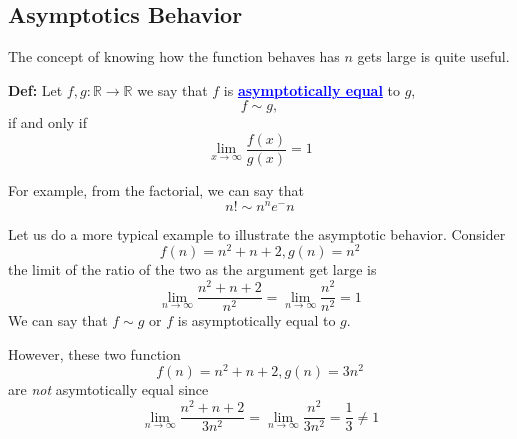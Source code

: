 \documentclass[a4paper, 12pt]{article}
\newcommand{\real}{\mathbb{R}}
\newcommand{\definition}{\vspace{1em}\noindent\textbf{Def:} }
\newcommand{\kwd}[1]{\textcolor{blue}{\textbf{\underline{#1}}}}
\begin{document}
\begin{multicols}{2}
\section*{Asymptotics Behavior}


The concept of knowing how the function behaves has $n$ gets large is quite useful.

\definition Let $f,g : \real \to \real$ we say that $f$ is \kwd{asymptotically equal} to $g$, 
\[
f \sim g,
\]
if and only if
\[
	\lim\limits_{x\to \infty} \frac{f(x)}{g(x)} = 1
\]

For example, from the factorial, we can say that
\[
	n! \sim n^n e^-n
\]

Let us do a more typical example to illustrate the asymptotic behavior. Consider
\[
	f(n) = n^2 +n +2, g(n) = n^2
\]
the limit of the ratio of the two as the argument get large is
\[
\lim\limits_{n\to \infty} \frac{n^2 +n + 2}{n^2} = \lim\limits_{n \to \infty} \frac{n^2}{n^2} = 1
\]
We can say that $f \sim g$ or $f$ is asymptotically equal to $g$.

However, these two function
\[
f(n) = n^2 +n +2, g(n) = 3 n^2
\]
are \emph{not} asymtotically equal since
\[
\lim\limits_{n\to \infty} \frac{n^2 +n + 2}{3n^2} = \lim\limits_{n \to \infty} \frac{n^2}{3n^2} = \frac{1}{3} \ne 1
\]
\end{multicols}
\end{document}
